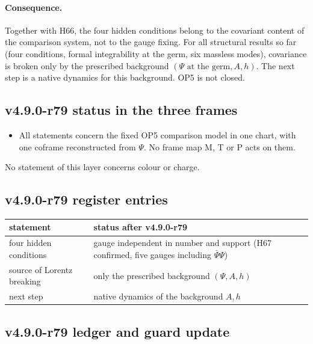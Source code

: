 \paragraph{Consequence.}
Together with H66, the four hidden conditions belong to the covariant content of the comparison system, not to the gauge
fixing.  For all structural results so far (four conditions, formal integrability at the germ, six massless modes),
covariance is broken only by the prescribed background \((\Psi\text{ at the germ},A,h)\).  The next step is a native
dynamics for this background.  OP5 is not closed.

\subsection*{v4.9.0-r79 status in the three frames}
\label{subsec:v490-r79-frames}

\begin{itemize}[leftmargin=2em]
\item All statements concern the fixed OP5 comparison model in one chart, with one coframe reconstructed from \(\Psi\).  No
frame map M, T or P acts on them.
\end{itemize}
No statement of this layer concerns colour or charge.

\subsection*{v4.9.0-r79 register entries}
\label{subsec:v490-r79-register}

\begin{center}
\small
\begin{tabular}{@{}>{\raggedright\arraybackslash}p{}>{\raggedright\arraybackslash}p{}@{}}
\toprule
statement & status after v4.9.0-r79\\
\midrule
four hidden conditions & gauge independent in number and support (H67 confirmed, five gauges including \(\bar\Psi\Psi\))\\
source of Lorentz breaking & only the prescribed background \((\Psi,A,h)\)\\
next step & native dynamics of the background \(A,h\)\\
\bottomrule
\end{tabular}
\end{center}

\subsection*{v4.9.0-r79 ledger and guard update}
\label{subsec:v490-r79-ledger-guard}

